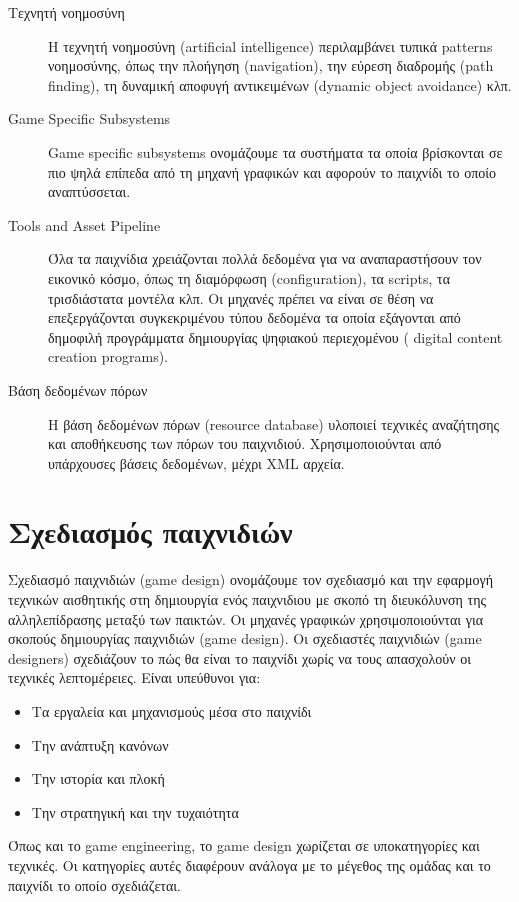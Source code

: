 \begin{description}
\item [Τεχνητή νοημοσύνη]Η τεχνητή νοημοσύνη (artificial intelligence) περιλαμβάνει τυπικά patterns νοημοσύνης, όπως την πλοήγηση (navigation), την εύρεση διαδρομής (path finding), τη δυναμική αποφυγή αντικειμένων (dynamic object avoidance) κλπ.

\item [Game Specific Subsystems]Game specific subsystems ονομάζουμε τα συστήματα τα οποία βρίσκονται σε πιο ψηλά επίπεδα από τη μηχανή γραφικών και αφορούν το παιχνίδι το οποίο αναπτύσσεται.

\item [Tools and Asset Pipeline]Όλα τα παιχνίδια χρειάζονται πολλά δεδομένα για να αναπαραστήσουν τον εικονικό κόσμο, όπως τη διαμόρφωση (configuration), τα scripts, τα τρισδιάστατα μοντέλα κλπ. Οι μηχανές πρέπει να είναι σε θέση να επεξεργάζονται συγκεκριμένου τύπου δεδομένα τα οποία εξάγονται από δημοφιλή προγράμματα δημιουργίας ψηφιακού περιεχομένου ( digital content creation programs).

\item [Βάση δεδομένων πόρων]Η βάση δεδομένων πόρων (resource database) υλοποιεί τεχνικές αναζήτησης και αποθήκευσης των πόρων του παιχνιδιού. Χρησιμοποιούνται από υπάρχουσες βάσεις δεδομένων, μέχρι \gls{XML} αρχεία. 
\end{description}

\section{Σχεδιασμός παιχνιδιών}
Σχεδιασμό παιχνιδιών (game design) ονομάζουμε τον σχεδιασμό και την εφαρμογή τεχνικών αισθητικής στη δημιουργία ενός παιχνιδιου με σκοπό τη διευκόλυνση της αλληλεπίδρασης μεταξύ των παικτών. Οι μηχανές γραφικών χρησιμοποιούνται για σκοπούς δημιουργίας παιχνιδιών (game design). Οι σχεδιαστές παιχνιδιών (game designers) σχεδιάζουν το πώς θα είναι το παιχνίδι χωρίς να τους απασχολούν οι τεχνικές λεπτομέρειες. Είναι υπεύθυνοι για:
\begin{itemize}
	\item Τα εργαλεία και μηχανισμούς μέσα στο παιχνίδι
	\item Την ανάπτυξη κανόνων
	\item Την ιστορία και πλοκή
	\item Την στρατηγική και την τυχαιότητα	
\end{itemize}

Όπως και το game engineering, το game design χωρίζεται σε υποκατηγορίες και τεχνικές. Οι κατηγορίες αυτές διαφέρουν ανάλογα με το μέγεθος της ομάδας και το παιχνίδι το οποίο σχεδιάζεται.

